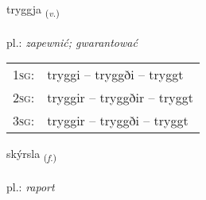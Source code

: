\documentclass[frontgrid, backgrid]{flacards}\usepackage[]{graphicx}\usepackage[]{xcolor}
\begin{document}
\renewcommand{\flhead}{\vskip5pt \fboxsep=0pt {\small\bfseries\footnotesize Sagnorð | czasownik}}
\renewcommand{\fcfoot}{\vskip5pt \fboxsep=0pt \hspace{2pt}{\small\bfseries\footnotesize 1K}}

\renewcommand{\blhead}{\vskip5pt {\small\bfseries\footnotesize Sagnorð | czasownik }}
\renewcommand{\bcfoot}{\vskip5pt \hspace{2pt}{\small\bfseries\footnotesize 1K}}


{tryggja \small{\textsubscript{(\textit{v.})}} \\[1ex] %
\textphonetic{[tʰrɪca]} \\
pl.: \emph{zapewnić; gwarantować} \\  [2ex]
\renewcommand*{\arraystretch}{0.8}
\begin{tabular}{p{1cm}l}
\textsc{1sg}: & tryggi -- tryggði -- tryggt \\ 
\textsc{2sg}: & tryggir -- tryggðir -- tryggt \\ 
\textsc{3sg}: & tryggir -- tryggði -- tryggt \\ 
\end{tabular}
}

\renewcommand{\flhead}{\vskip5pt \fboxsep=0pt {\small\bfseries\footnotesize Nafnorð | rzeczownik}}
\renewcommand{\fcfoot}{\vskip5pt \fboxsep=0pt \hspace{2pt}{\small\bfseries\footnotesize 1K}}

\renewcommand{\blhead}{\vskip5pt {\small\bfseries\footnotesize Nafnorð | rzeczownik }}
\renewcommand{\bcfoot}{\vskip5pt \hspace{2pt}{\small\bfseries\footnotesize 1K}}


{skýrsla \small{\textsubscript{(\textit{f.})}} \\[1ex] %
 \\
pl.: \emph{raport} \\  [2ex]
\renewcommand*{\arraystretch}{0.8}
}
\end{document}
